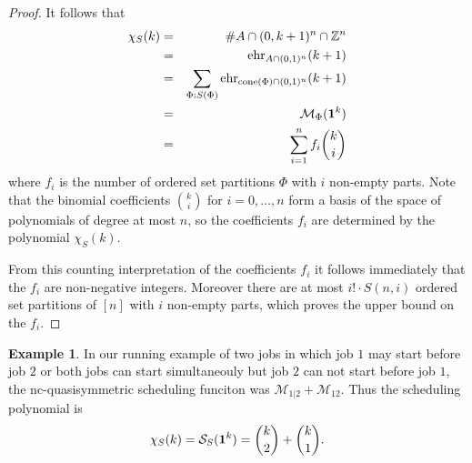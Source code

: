\documentclass[12pt,reqno]{amsart}
\numberwithin{definition}{section}
\theoremstyle{definition}
\newtheorem{example}[definition]{Example}
\newcommand{\ZZ}{\mathbb{Z}}
\newcommand{\SSS}{\mathcal{S}}
\newcommand{\ehr}{\operatorname{ehr}}
\newcommand{\cone}{\operatorname{cone}}
\newcommand{\ncM}{\mathcal{M}}
\newcommand{\poly}{\chi} %
\begin{document}
\begin{proof}
It follows that
\begin{eqnarray*}
  \poly_S(k) &=& \#A\cap(0,k+1)^n\cap\ZZ^n \\
  &=& \ehr_{A\cap(0,1)^n}(k+1) \\
  &=& \sum_{\Phi:S(\Phi)} \ehr_{\cone(\Phi)\cap(0,1)^n}(k+1) \\
  &=& \ncM_{\Phi}({\bf 1}^k) \\  
&=& \sum_{i=1}^n f_i\binom{k}{i}
\end{eqnarray*}
where $f_i$ is the number of ordered set partitions $\Phi$ with $i$ non-empty parts. Note that the binomial coefficients $\binom{k}{i}$ for $i=0,\ldots,n$ form a basis of the space of polynomials of degree at most $n$, so the coefficients $f_i$ are determined by the polynomial $\poly_S(k)$. 

From this counting interpretation of the coefficients $f_i$ it follows immediately that the $f_i$ are non-negative integers. Moreover there are at most $i!\cdot S(n,i)$ ordered set partitions of $[n]$ with $i$ non-empty parts, which proves the upper bound on the $f_i$. 

\end{proof}


\begin{example}
In our running example of two jobs in which job $1$ may start before job $2$ or both jobs can start simultaneouly but job $2$ can not start before job $1$, the nc-quasisymmetric scheduling funciton was $\ncM_{1|2} + \ncM_{12}$.  Thus the scheduling polynomial is
$$\poly_S(k) = \SSS_S({\bf 1}^k) = \binom{k}{2} + \binom{k}{1}.$$
\end{example}
\end{document}
